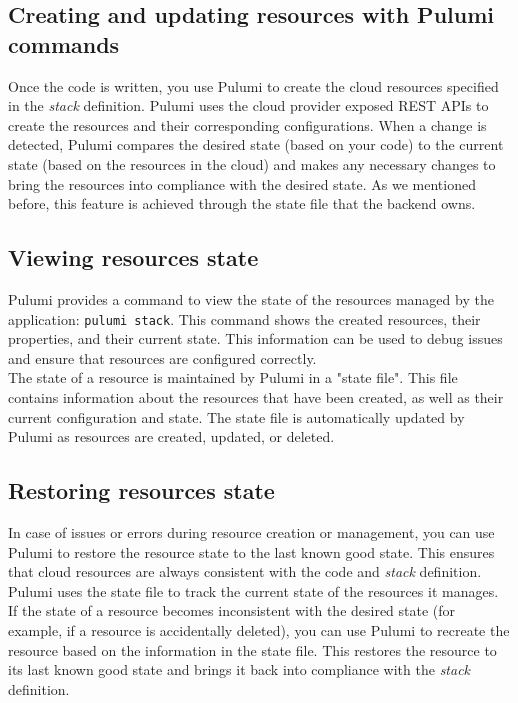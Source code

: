 \subsection{Creating and updating resources with Pulumi commands}
Once the code is written, you use Pulumi to create the cloud resources specified in the \textit{stack} definition.
Pulumi uses the cloud provider exposed REST APIs to create the resources and their corresponding configurations. 
When a change is detected, Pulumi compares the desired state (based on your code) to the current state (based on the resources in the cloud) and makes any necessary changes to bring the resources into compliance with the desired state.
As we mentioned before, this feature is achieved through the state file that the backend owns.

\subsection{Viewing resources state}
Pulumi provides a command to view the state of the resources managed by the application: \texttt{pulumi stack}.
This command shows the created resources, their properties, and their current state. 
This information can be used to debug issues and ensure that resources are configured correctly.\\
The state of a resource is maintained by Pulumi in a "state file".
This file contains information about the resources that have been created, as well as their current configuration and state.
The state file is automatically updated by Pulumi as resources are created, updated, or deleted.

\subsection{Restoring resources state}
In case of issues or errors during resource creation or management, you can use Pulumi to restore the resource state to the last known good state.
This ensures that cloud resources are always consistent with the code and \textit{stack} definition.\\
Pulumi uses the state file to track the current state of the resources it manages.
If the state of a resource becomes inconsistent with the desired state (for example, if a resource is accidentally deleted), you can use Pulumi to recreate the resource based on the information in the state file.
This restores the resource to its last known good state and brings it back into compliance with the \textit{stack} definition.

